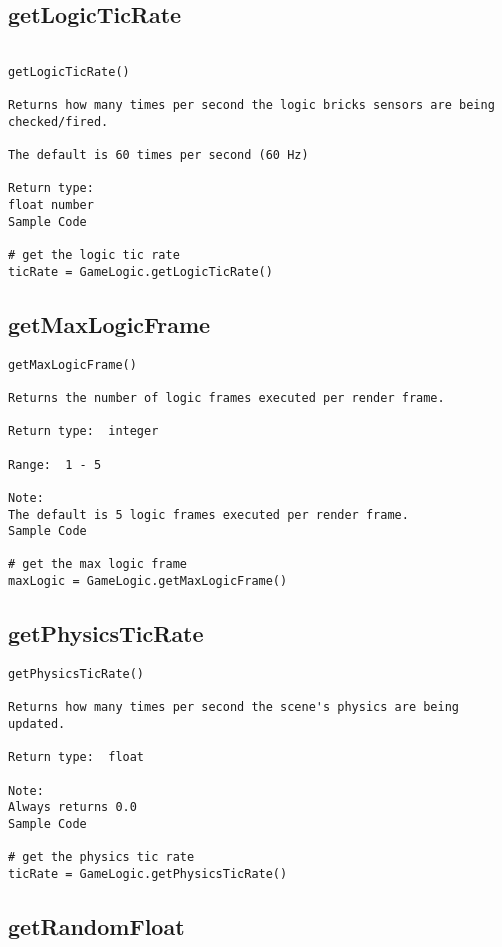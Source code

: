\subsection{getLogicTicRate}
\begin{verbatim}

getLogicTicRate()

Returns how many times per second the logic bricks sensors are being checked/fired.  

The default is 60 times per second (60 Hz)

Return type:
float number
Sample Code

# get the logic tic rate
ticRate = GameLogic.getLogicTicRate()
\end{verbatim}

\subsection{getMaxLogicFrame}

\begin{verbatim}
getMaxLogicFrame()

Returns the number of logic frames executed per render frame.

Return type:  integer

Range:  1 - 5

Note:
The default is 5 logic frames executed per render frame.
Sample Code

# get the max logic frame 
maxLogic = GameLogic.getMaxLogicFrame()
\end{verbatim}

\subsection{getPhysicsTicRate}

\begin{verbatim}
getPhysicsTicRate()

Returns how many times per second the scene's physics are being updated.  

Return type:  float 

Note:
Always returns 0.0
Sample Code

# get the physics tic rate
ticRate = GameLogic.getPhysicsTicRate()
\end{verbatim}

\subsection{getRandomFloat}

